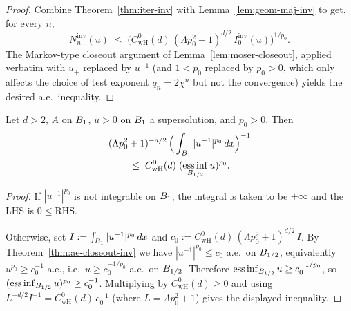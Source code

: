 \begin{proof}
\leanok
{}

Combine Theorem~\ref{thm:iter-inv} with Lemma~\ref{lem:geom-maj-inv} to get,
for every $n$,
\begin{equation*}
  N_n^{\mathrm{inv}}(u)
  \;\leq\;
  \big(C_{\mathrm{wH}}^{0}(d)\,(\Lambda p_0^{2}+1)^{d/2}\,I_0^{\mathrm{inv}}(u)\big)^{1/p_0}.
\end{equation*}
The Markov-type closeout argument of Lemma~\ref{lem:moser-closeout}, applied
verbatim with $u_+$ replaced by $u^{-1}$ (and $1<p_0$ replaced by $p_0>0$, which
only affects the choice of test exponent $q_n = 2\chi^{n}$ but not the
convergence) yields the desired a.e.\ inequality.
\end{proof}

\begin{theorem}
\label{thm:wH-stage1-inv}
\leanok
{}
Let $d>2$, $A$ on $B_{1}$, $u>0$ on $B_{1}$ a supersolution, and $p_0 > 0$. Then
\begin{multline*}
  (\Lambda p_0^{2}+1)^{-d/2}\,
  \Big(\int_{B_{1}} |u^{-1}|^{p_0}\,dx\Big)^{-1}
  \\
  \;\leq\; C_{\mathrm{wH}}^{0}(d)\;(\operatorname*{ess\,inf}_{B_{1/2}} u)^{p_0}.
\end{multline*}
\end{theorem}

\begin{proof}
\leanok
{}

If $|u^{-1}|^{p_0}$ is not integrable on $B_{1}$, the integral is taken to be
$+\infty$ and the LHS is $0 \leq \mathrm{RHS}$.

Otherwise, set $I := \int_{B_{1}} |u^{-1}|^{p_0}\,dx$ and
$c_0 := C_{\mathrm{wH}}^{0}(d)\,(\Lambda p_0^{2}+1)^{d/2}\,I$. By
Theorem~\ref{thm:ae-closeout-inv} we have $|u^{-1}|^{p_0} \leq c_0$ a.e.\ on
$B_{1/2}$, equivalently $u^{p_0} \geq c_0^{-1}$ a.e., i.e.\
$u \geq c_0^{-1/p_0}$ a.e.\ on $B_{1/2}$. Therefore
$\operatorname*{ess\,inf}_{B_{1/2}} u \geq c_0^{-1/p_0}$, so
$(\operatorname*{ess\,inf}_{B_{1/2}} u)^{p_0} \geq c_0^{-1}$. Multiplying by
$C_{\mathrm{wH}}^{0}(d) \geq 0$ and using
$L^{-d/2} I^{-1} = C_{\mathrm{wH}}^{0}(d)\,c_0^{-1}$ (where $L = \Lambda p_0^{2}+1$)
gives the displayed inequality.
\end{proof}

